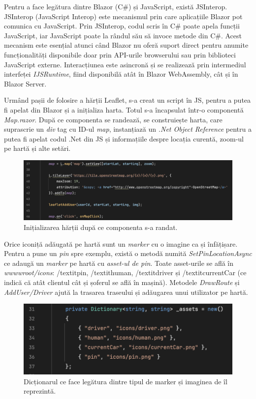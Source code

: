 Pentru a face legătura dintre Blazor (C\#) și JavaScript, există JSInterop. JSInterop 
(JavaScript Interop) este mecanismul prin care aplicațiile Blazor pot comunica cu 
JavaScript. Prin JSInterop, codul scris în C\# poate apela funcții JavaScript, iar 
JavaScript poate la rândul său să invoce metode din C\#. Acest mecanism este esențial 
atunci când Blazor nu oferă suport direct pentru anumite funcționalități disponibile 
doar prin API-urile browserului sau prin biblioteci JavaScript externe. Interacțiunea 
este asincronă și se realizează prin intermediul interfeței \textit{IJSRuntime}, fiind 
disponibilă atât în Blazor WebAssembly, cât și în Blazor Server. \parencite{blazor} 

Urmând pașii de folosire a hărții Leaflet, s-a creat un script în JS, pentru a putea fi
apelat din Blazor și a inițializa harta. Totul s-a încapsulat într-o componentă \textit{Map.razor}.
După ce componenta se randează, se construiește harta, care suprascrie un \textit{div} tag cu ID-ul \textit{map}, instanțiază
un \textit{.Net Object Reference} pentru a putea fi apelat codul .Net din JS și informațiile despre locația curentă, zoom-ul 
pe hartă și alte setări.

\begin{figure}[H]
    \centering
    \includegraphics[width=14cm]{Assets/initLeaflet.png}
    \caption{Inițializarea hărții după ce componenta s-a randat.}
    \label{fig:initLeaflet}
\end{figure}

Orice iconiță adăugată pe hartă sunt un \textit{marker} cu o imagine ca și înfățișare. Pentru a pune un \textit{pin} spre exemplu, există o metodă numită \textit{SetPinLocationAsync} ce adaugă un \textit{marker} pe hartă cu \textit{asset-ul de pin}.
Toate asset-urile se află în \textit{wwwwroot/icons}: /textit{pin}, /textit{human}, /textit{driver} și /textit{currentCar} (ce indică că atât clientul cât și șoferul se află în mașină).
Metodele \textit{DrawRoute} și \textit{AddUser/Driver} ajută la trasarea traseului și adăugarea unui utilizator pe hartă.

\begin{figure}[H]
    \centering
    \includegraphics[width=14cm]{Assets/icons.png}
    \caption{Dicționarul ce face legătura dintre tipul de marker și imaginea de îl reprezintă.}
    \label{fig:icons}
\end{figure}

